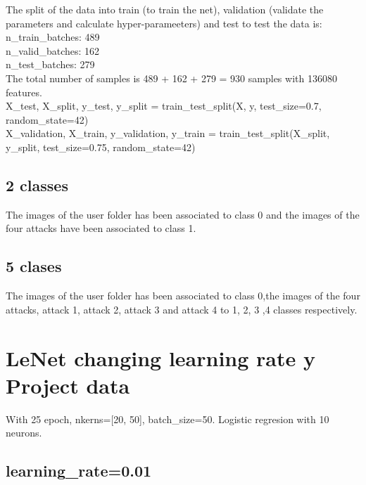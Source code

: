 \documentclass[a4paper]{article}
\begin{document}
The split of the data into train (to train the net), validation (validate the parameters and calculate hyper-parameeters) and test to test the data is:\\
n\_train\_batches: 489\\
n\_valid\_batches: 162\\
n\_test\_batches: 279\\

The total number of samples is 489 + 162 + 279 = 930 samples with 136080 features.\\

 X\_test, X\_split, y\_test, y\_split = train\_test\_split(X, y, test\_size=0.7, random\_state=42) \\
    X\_validation, X\_train, y\_validation, y\_train = train\_test\_split(X\_split, y\_split, test\_size=0.75, random\_state=42) \\

\subsection{2 classes}
The images of the user folder has been associated to class 0 and the images of the four attacks have been associated to class 1.\\

\subsection{5 clases}
The images of the user folder has been associated to class 0,the images of the four attacks, attack 1, attack 2, attack 3 and attack 4 to 1, 2, 3 ,4 classes respectively.\\


\section{LeNet changing learning rate y Project data}

With 25 epoch, nkerns=[20, 50], batch\_size=50. Logistic regresion with 10 neurons.\\

\subsection{learning\_rate=0.01}
\end{document}
